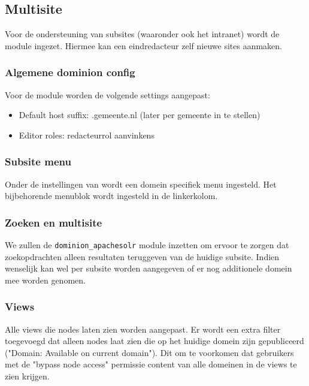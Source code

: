 \subsection{Multisite}\label{multisite}

Voor de ondersteuning van subsites (waaronder ook het intranet) wordt de  module ingezet. Hiermee kan een eindredacteur zelf nieuwe sites aanmaken.

\subsubsection{Algemene dominion config}
Voor de  module worden de volgende settings aangepast:
\begin{itemize}
\item Default host suffix: .gemeente.nl (later per gemeente in te stellen)
\item Editor roles: redacteurrol aanvinkens
\end{itemize}

\subsubsection{Subsite menu}
Onder de instellingen van  wordt een domein specifiek menu ingesteld. Het bijbehorende menublok wordt ingesteld in de linkerkolom.

\subsubsection{Zoeken en multisite}
We zullen de \texttt{dominion\_apachesolr} module inzetten om ervoor te zorgen dat zoekopdrachten alleen resultaten teruggeven van de huidige subsite. Indien wenselijk kan wel per subsite worden aangegeven of er nog additionele domein mee worden genomen.

\subsubsection{Views}
Alle views die nodes laten zien worden aangepast. Er wordt een extra filter toegevoegd dat alleen nodes laat zien die op het huidige domein zijn gepubliceerd ("Domain: Available on current domain"). Dit om te voorkomen dat gebruikers met de "bypass node access" permissie content van alle domeinen in de views te zien krijgen.
